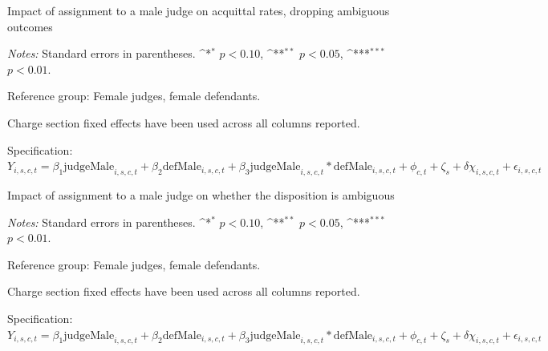 \documentclass[12pt,english]{article}
\def\sym#1{\ifmmode^{#1}\else\(^{#1}\)\fi}
\begin{document}
\begin{appendices}
\begin{landscape}
\begin{table}
  \begin{center}
     \caption{Impact of assignment to a male judge on acquittal rates, dropping ambiguous outcomes}
      \label{tab:amb_random_female}
     
    \end{center}
    \begin{minipage}{1.6\textwidth}
        \footnotesize 
        \emph{Notes:} Standard errors in parentheses. \sym{*} \(p<0.10\), \sym{**} \(p<0.05\), \sym{***} \(p<0.01\).  \par 
        Reference group: Female judges, female defendants.  \par
        Charge section fixed effects have been used across all columns reported. \par
        Specification: $Y_{i,s,c,t} = \beta_{1} \text{judgeMale}_{i,s,c,t} + \beta_{2} \text{defMale}_{i,s,c,t} + \beta_{3} \text{judgeMale}_{i,s,c,t} * \text{defMale}_{i,s,c,t} + \phi_{c,t} + \zeta_{s} + \delta \chi_{i,s,c,t} + \epsilon_{i,s,c,t}$ \par
   \end{minipage}
\end{table}

\begin{table}
  \begin{center}
     \caption{Impact of assignment to a male judge on whether the disposition is ambiguous}
      \label{tab:robust_amb_female}
     
    \end{center}
    \begin{minipage}{1.6\textwidth}
        \footnotesize 
        \emph{Notes:} Standard errors in parentheses. \sym{*} \(p<0.10\), \sym{**} \(p<0.05\), \sym{***} \(p<0.01\).  \par 
        Reference group: Female judges, female defendants.  \par
        Charge section fixed effects have been used across all columns reported. \par
        Specification: $Y_{i,s,c,t} = \beta_{1} \text{judgeMale}_{i,s,c,t} + \beta_{2} \text{defMale}_{i,s,c,t} + \beta_{3} \text{judgeMale}_{i,s,c,t} * \text{defMale}_{i,s,c,t} + \phi_{c,t} + \zeta_{s} + \delta \chi_{i,s,c,t} + \epsilon_{i,s,c,t}$ \par
   \end{minipage}
\end{table}


\end{landscape}
\end{appendices}
\end{document}
